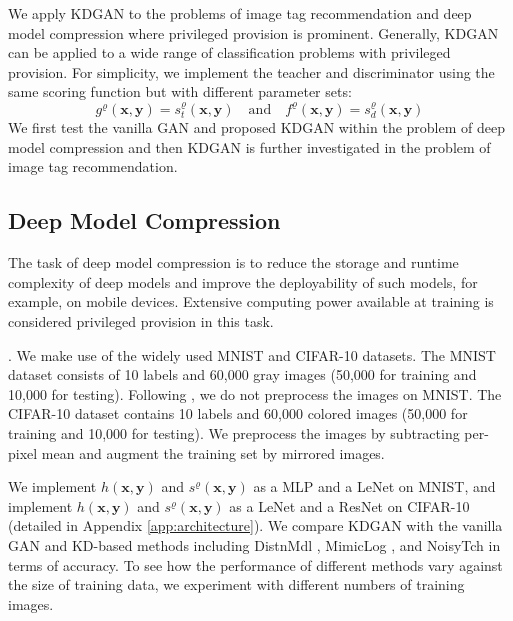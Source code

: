 \documentclass{article}
\newcommand{\OVEC}[1]{\bm{#1}} %
\newcommand{\stdscore}{h(\OVEC{x},\OVEC{y})}
\newcommand{\tchscore}{g^{\varrho}(\OVEC{x},\OVEC{y})}
\newcommand{\disscore}{f^{\varrho}(\OVEC{x},\OVEC{y})}
\newcommand{\priscore}[1]{s^{\varrho}_{#1}(\OVEC{x},\OVEC{y})}
\begin{document}
We apply KDGAN to the problems of image tag recommendation and deep model compression where privileged provision is prominent.
Generally, KDGAN can be applied to a wide range of classification problems with privileged provision.
For simplicity, we implement the teacher and discriminator using the same scoring function but with different parameter sets:
\begin{equation}
\tchscore
=
\priscore{t}
\quad
\text{and}
\quad
\disscore
=
\priscore{d}
\end{equation}%
We first test the vanilla GAN and proposed KDGAN within the problem of deep model compression and then KDGAN is further investigated in the problem of image tag recommendation.

\subsection{Deep Model Compression} \label{sec:deep model compression}

The task of deep model compression is to reduce the storage and runtime complexity of deep models and improve the deployability of such models, for example, on mobile devices.
Extensive computing power available at training is considered privileged provision in this task.

.
We make use of the widely used MNIST \cite{lecun1998gradient} and CIFAR-10 \cite{krizhevsky2009learning} datasets.
The MNIST dataset consists of 10 labels and 60,000 gray images (50,000 for training and 10,000 for testing).
Following \cite{sau2016deep}, we do not preprocess the images on MNIST.
The CIFAR-10 dataset contains 10 labels and 60,000 colored images (50,000 for training and 10,000 for testing).
We preprocess the images by subtracting per-pixel mean and augment the training set by mirrored images.

We implement $\stdscore$ and $\priscore{}$ as a MLP \cite{lecun1998gradient} and a LeNet \cite{lecun1998gradient} on MNIST, and implement $\stdscore$ and $\priscore{}$ as a LeNet \cite{lecun1998gradient} and a ResNet \cite{he2016deep} on CIFAR-10 (detailed in Appendix \ref{app:architecture}).
We compare KDGAN with the vanilla GAN and KD-based methods including DistnMdl \cite{hinton2015distilling}, MimicLog \cite{ba2014deep}, and NoisyTch \cite{sau2016deep} in terms of accuracy.
To see how the performance of different methods vary against the size of training data, we experiment with different numbers of training images.
\end{document}
